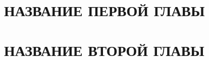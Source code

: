 \documentclass[a4paper,14pt,russian]{extreport}
\begin{document}
    
    
    \tableofcontents
    
    \newpage
    
    
    \chapter{НАЗВАНИЕ ПЕРВОЙ ГЛАВЫ}
    
    
    \chapter{НАЗВАНИЕ ВТОРОЙ ГЛАВЫ}
    
    
    \newpage
    
    
    \newpage
    
    
    \newpage
    \listoffigures
    \newpage
    \listoftables
    \newpage
    \listoflistings
\end{document}
